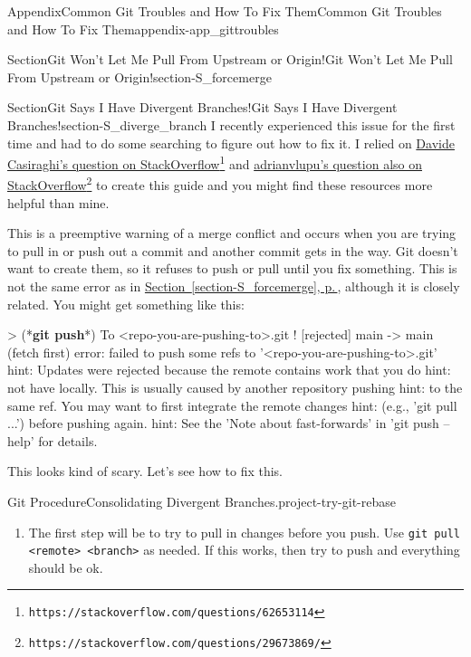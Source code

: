 \documentclass[twoside,10pt,]{book}
\newcommand{\xreffont}{\relax}
\newcommand{\mono}[1]{\texttt{#1}}
\newcommand{\consoleinput}[1]{\textbf{#1}}
\begin{document}
\begin{appendixptx}{Appendix}{Common Git Troubles and How To Fix Them}{}{Common Git Troubles and How To Fix Them}{}{}{appendix-app_gittroubles}
\begin{sectionptx}{Section}{Git Won't Let Me Pull From Upstream or Origin!}{}{Git Won't Let Me Pull From Upstream or Origin!}{}{}{section-S_forcemerge}
\end{sectionptx}
%
%
\typeout{************************************************}
\typeout{************************************************}
%
\begin{sectionptx}{Section}{Git Says I Have Divergent Branches!}{}{Git Says I Have Divergent Branches!}{}{}{section-S_diverge_branch}
I recently experienced this issue for the first time and had to do some searching to figure out how to fix it. I relied on \href{https://stackoverflow.com/questions/62653114}{Davide Casiraghi's question on StackOverflow}\footnote{\nolinkurl{https://stackoverflow.com/questions/62653114}\label{fn-S_diverge_branch-b-b}} and \href{https://stackoverflow.com/questions/29673869/}{adrianvlupu's question also on StackOverflow}\footnote{\nolinkurl{https://stackoverflow.com/questions/29673869/}\label{fn-S_diverge_branch-b-d}} to create this guide and you might find these resources more helpful than mine.%
\par
This is a preemptive warning of a merge conflict and occurs when you are trying to pull in or push out a commit and another commit gets in the way. Git doesn't want to create them, so it refuses to push or pull until you fix something. This is not the same error as in \hyperref[section-S_forcemerge]{Section~{\xreffont\ref{section-S_forcemerge}}, p.\,\pageref{section-S_forcemerge}}, although it is closely related. You might get something like this:%
\begin{console}{0}{1}{0}
> (*\consoleinput{git push}*)
To <repo-you-are-pushing-to>.git
 ! [rejected]        main -> main (fetch first)
error: failed to push some refs to '<repo-you-are-pushing-to>.git'
hint: Updates were rejected because the remote contains work that you do
hint: not have locally. This is usually caused by another repository pushing
hint: to the same ref. You may want to first integrate the remote changes
hint: (e.g., 'git pull ...') before pushing again.
hint: See the 'Note about fast-forwards' in 'git push --help' for details.
\end{console}
This looks kind of scary. Let's see how to fix this.%
\begin{project}{Git Procedure}{Consolidating Divergent Branches.}{project-try-git-rebase}%
\begin{enumerate}[font=\bfseries,label=(\alph*),ref=\alph*]%
\item{}The first step will be to try to pull in changes before you push. Use \mono{git pull <remote> <branch>} as needed. If this works, then try to push and everything should be ok.%

\end{enumerate}
\end{project}
\end{sectionptx}
\end{appendixptx}
\end{document}
